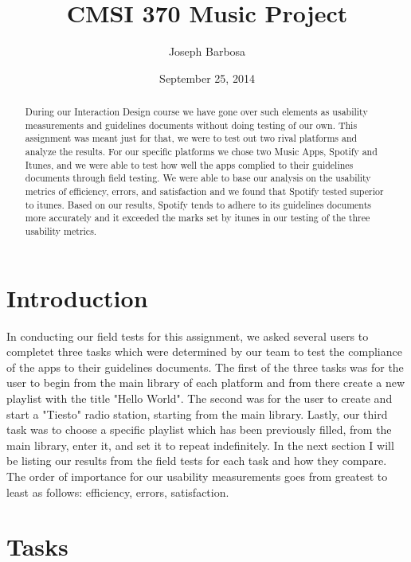 \documentclass[a4paper]{article}
\title{CMSI 370 Music Project}
\author{Joseph Barbosa}
\date{September 25, 2014}
\begin{document}
\maketitle

\begin{abstract}
During our Interaction Design course we have gone over such elements as usability measurements and guidelines documents without doing testing of our own. This assignment was meant just for that, we were to test out two rival platforms and analyze the results. For our specific platforms we chose two Music Apps, Spotify and Itunes, and we were able to test how well the apps complied to their guidelines documents through field testing. We were able to base our analysis on the usability metrics of efficiency, errors, and satisfaction and we found that Spotify tested superior to itunes. Based on our results, Spotify tends to adhere to its guidelines documents more accurately and it exceeded the marks set by itunes in our testing of the three usability metrics.
\end{abstract}

\section{Introduction}

In conducting our field tests for this assignment, we asked several users to completet three tasks which were determined by our team to test the compliance of the apps to their guidelines documents. The first of the three tasks was for the user to begin from the main library of each platform and from there create a new playlist with the title "Hello World". The second was for the user to create and start a "Tiesto" radio station, starting from the main library. Lastly, our third task was to choose a specific playlist which has been previously filled, from the main library, enter it, and set it to repeat indefinitely. In the next section I will be listing our results from the field tests for each task and how they compare. The order of importance for our usability measurements goes from greatest to least as follows: efficiency, errors, satisfaction.



\section{Tasks}
\label{sec:tasks}
\end{document}
